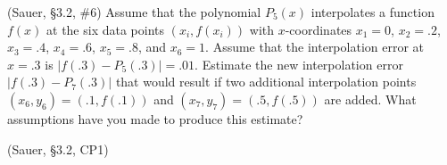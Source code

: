 \documentclass[12pt,fleqn]{exam}
\begin{document}
\begin{questions}
\question (Sauer, \S3.2, \#6) Assume that the polynomial $P_5(x)$ interpolates a function $f(x)$ at the six data points $(x_i,f(x_i))$ with $x$-coordinates $x_1 = 0$, $x_2 = .2$, $x_3 = .4$, $x_4 = .6$, $x_5 = .8$, and $x_6 = 1$. Assume that the interpolation error at $x = .3$ is $|f(.3) - P_5(.3)| = .01$. Estimate the new interpolation error $|f(.3) - P_7(.3)|$ that would result if two additional interpolation points $(x_6, y_6) = (.1, f(.1))$ and $(x_7, y_7) = (.5, f(.5))$ are added. What assumptions have you made to produce this estimate?

\question (Sauer, \S3.2, CP1)


\end{questions}
\end{document}
